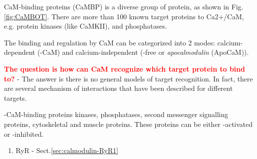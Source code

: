 CaM-binding proteins (CaMBP) is a diverse group of protein, as shown in
Fig.\ref{fig:CaMBOT}. There are more than 100 known target proteins to Ca2+/CaM,
e.g. protein kinases (like CaMKII), and phosphatases.

The binding and regulation by CaM can be categorized into 2 modes:
calcium-dependent (-CaM) and calcium-independent (-free or
{\it apocalmodulin} (ApoCaM)).

\textcolor{red}{\bf The question is how can CaM recognize which target protein
to bind to?} - The answer is there is no general models of target recognition.
In fact, there are several mechanism of interactions that have been described
for different targets.

-CaM-binding proteins kinases, phosphatases, second
messenger signalling proteins, cytoskeletal and muscle proteins.
These proteins can be either -activated or
-inhibited.

\begin{enumerate}
  \item RyR - Sect.\ref{sec:calmodulin-RyR1}
\end{enumerate}


